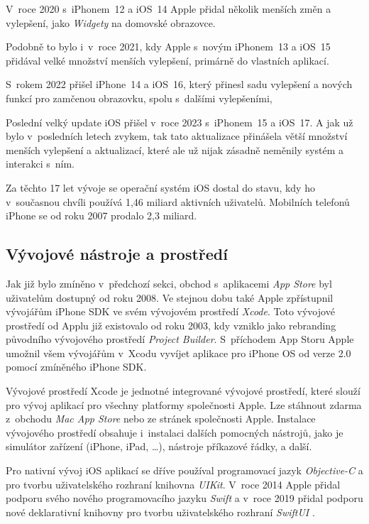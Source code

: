 V~roce 2020 s~iPhonem~12 a iOS~14 Apple přidal několik menších změn a vylepšení, jako \emph{Widgety} na domovské obrazovce.

Podobně to bylo i~v~roce 2021, kdy Apple s~novým iPhonem~13 a iOS~15 přidával velké množství menších vylepšení, primárně do vlastních aplikací.

S~rokem 2022 přišel iPhone~14 a iOS~16, který přinesl sadu vylepšení a nových funkcí pro zamčenou obrazovku, spolu s~dalšími vylepšeními,

Poslední velký update iOS přišel v~roce 2023 s~iPhonem~15 a iOS~17. A jak už bylo v~posledních letech zvykem, tak tato aktualizace přinášela větší množství menších vylepšení a aktualizací, které ale už nijak zásadně neměnily systém a interakci s~ním. \cite{history-of-ios}

Za těchto 17 let vývoje se operační systém iOS dostal do stavu, kdy ho v~současnou chvíli používá 1,46 miliard aktivních uživatelů. Mobilních telefonů iPhone se od roku 2007 prodalo 2,3 miliard. \cite{iphone-user-statistics}

\subsection{Vývojové nástroje a prostředí}\label{ios-dev-tools}

Jak již bylo zmíněno v~předchozí sekci, obchod s~aplikacemi \emph{App Store} byl uživatelům dostupný od roku 2008. Ve stejnou dobu také Apple zpřístupnil vývojářům iPhone SDK ve svém vývojovém prostředí \emph{Xcode}. Toto vývojové prostředí od Applu již existovalo od roku 2003, kdy vzniklo jako rebranding původního vývojového prostředí \emph{Project Builder}. S~příchodem App Storu Apple umožnil všem vývojářům v~Xcodu vyvíjet aplikace pro iPhone OS od verze 2.0 pomocí zmíněného iPhone SDK. 

Vývojové prostředí Xcode je jednotné integrované vývojové prostředí, které slouží pro vývoj aplikací pro všechny platformy společnosti Apple. Lze stáhnout zdarma z~obchodu \emph{Mac App Store} nebo ze stránek společnosti Apple. Instalace vývojového prostředí obsahuje i~instalaci dalších pomocných nástrojů, jako je simulátor zařízení (iPhone, iPad, \dots), nástroje příkazové řádky, a další. \cite{xcode-history}

Pro nativní vývoj iOS aplikací se dříve používal programovací jazyk \emph{Objective-C} \cite{objc} a pro tvorbu uživatelského rozhraní knihovna \emph{UIKit}. V~roce 2014 Apple přidal podporu svého nového programovacího jazyku \emph{Swift} \cite{swift} a v~roce 2019 přidal podporu nové deklarativní knihovny pro tvorbu uživatelského rozhraní \emph{SwiftUI} \cite{swiftui}.

